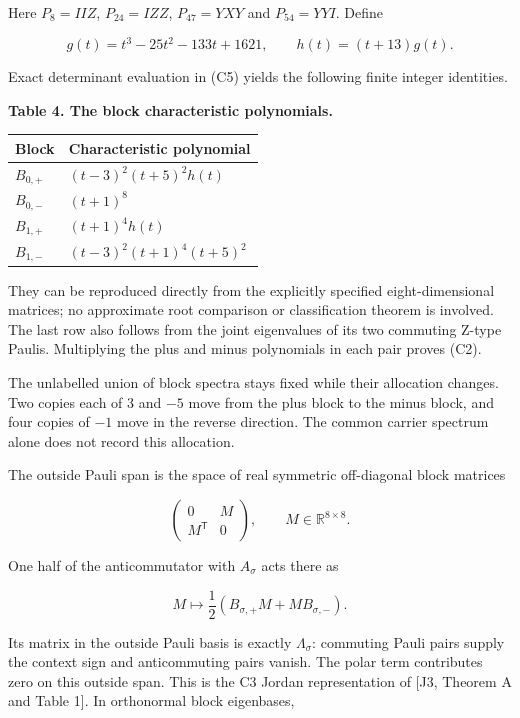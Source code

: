 \documentclass[11pt,a4paper]{article}
\begin{document}
Here \(P_8=IIZ\), \(P_{24}=IZZ\), \(P_{47}=YXY\) and \(P_{54}=YYI\). Define

\[g(t)=t^3-25t^2-133t+1621,\qquad h(t)=(t+13)g(t).\]

Exact determinant evaluation in (C5) yields the following finite integer identities.

\textbf{Table 4. The block characteristic polynomials.}

{\def\LTcaptype{none} %
{\small
\begin{longtable}[]{@{}>{\raggedright\arraybackslash}p{}>{\raggedright\arraybackslash}p{}@{}}
\toprule\noalign{}
Block & Characteristic polynomial \\
\midrule\noalign{}
\endhead
\bottomrule\noalign{}
\endlastfoot
\(B_{0,+}\) & \((t-3)^2(t+5)^2h(t)\) \\
\(B_{0,-}\) & \((t+1)^8\) \\
\(B_{1,+}\) & \((t+1)^4h(t)\) \\
\(B_{1,-}\) & \((t-3)^2(t+1)^4(t+5)^2\) \\
\end{longtable}
}
}

They can be reproduced directly from the explicitly specified eight-dimensional matrices; no
approximate root comparison or classification theorem is involved. The last row also follows from
the joint eigenvalues of its two commuting Z-type Paulis. Multiplying the plus and minus polynomials
in each pair proves (C2).

The unlabelled union of block spectra stays fixed while their allocation changes. Two copies each of
\(3\) and \(-5\) move from the plus block to the minus block, and four copies of \(-1\) move in the reverse
direction. The common carrier spectrum alone does not record this allocation.

The outside Pauli span is the space of real symmetric off-diagonal block matrices

\[\begin{pmatrix}0&M\\M^{\mathsf T}&0\end{pmatrix},\qquad M\in\mathbb R^{8\times8}.\]

One half of the anticommutator with \(A_\sigma\) acts there as

\[M\longmapsto\frac12(B_{\sigma,+}M+MB_{\sigma,-}).
\tag{C6}\]

Its matrix in the outside Pauli basis is exactly \(\Lambda_\sigma\): commuting Pauli pairs supply the
context sign and anticommuting pairs vanish. The polar term contributes zero on this outside span.
This is the C3 Jordan representation of {[}J3, Theorem A and Table 1{]}. In orthonormal block eigenbases,
\end{document}
